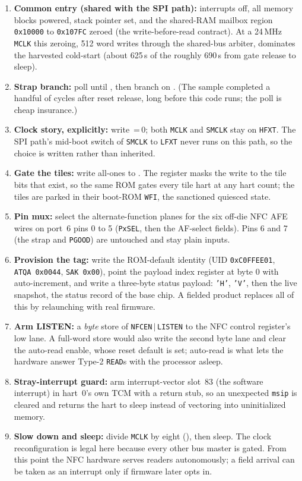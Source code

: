 \begin{enumerate}
\item \textbf{Common entry (shared with the SPI path):} interrupts off, all memory blocks powered, stack pointer set, and the shared-RAM mailbox region \texttt{0x10000} to \texttt{0x107FC} zeroed (the write-before-read contract). At a 24\,MHz \texttt{MCLK} this zeroing, 512 word writes through the shared-bus arbiter, dominates the harvested cold-start (about 625\,\textmu s of the roughly 690\,\textmu s from gate release to sleep).
\item \textbf{Strap branch:} poll  until , then branch on . (The sample completed a handful of cycles after reset release, long before this code runs; the poll is cheap insurance.)
\item \textbf{Clock story, explicitly:} write \,=\,0; both \texttt{MCLK} and \texttt{SMCLK} stay on \texttt{HFXT}. The SPI path's mid-boot switch of \texttt{SMCLK} to \texttt{LFXT} never runs on this path, so the choice is written rather than inherited.
\item \textbf{Gate the tiles:} write all-ones to  . The register masks the write to the tile bits that exist, so the same ROM gates every tile hart at any hart count; the tiles are parked in their boot-ROM \texttt{WFI}, the sanctioned quiesced state.
\item \textbf{Pin mux:} select the alternate-function planes for the six off-die NFC AFE wires on port~6 pins 0 to 5 (\texttt{PxSEL}, then the AF-select fields). Pins 6 and 7 (the strap and \texttt{PGOOD}) are untouched and stay plain inputs.
\item \textbf{Provision the tag:} write the ROM-default identity (UID \texttt{0xC0FFEE01}, \texttt{ATQA}~\texttt{0x0044}, \texttt{SAK}~\texttt{0x00}), point the payload index register at byte 0 with auto-increment, and write a three-byte status payload: \texttt{'H'}, \texttt{'V'}, then the live  snapshot, the status record of the base chip. A fielded product replaces all of this by relaunching with real firmware.
\item \textbf{Arm LISTEN:} a \textit{byte} store of \texttt{NFCEN}\,$|$\,\texttt{LISTEN} to the NFC control register's low lane. A full-word store would also write the second byte lane and clear the auto-read enable, whose reset default is set; auto-read is what lets the hardware answer Type-2 \texttt{READ}s with the processor asleep.
\item \textbf{Stray-interrupt guard:} arm interrupt-vector slot~83 (the software interrupt) in hart~0's own TCM with a return stub, so an unexpected \texttt{msip} is cleared and returns the hart to sleep instead of vectoring into uninitialized memory.
\item \textbf{Slow down and sleep:} divide \texttt{MCLK} by eight (), then sleep. The clock reconfiguration is legal here because every other bus master is gated. From this point the NFC hardware serves readers autonomously; a field arrival can be taken as an interrupt only if firmware later opts in.
\end{enumerate}



